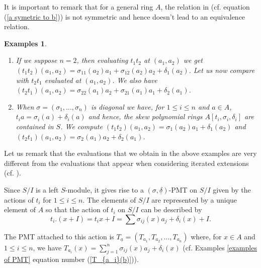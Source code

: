 \documentclass[12pt,a4paper]{article}
\newtheorem{examples}[theorem]{Examples}
\newtheorem{remark}[theorem]{Remark}
\newcommand{\de}{\delta}
\newcommand{\si}{\sigma}
\newcommand{\ua}{\underline{a}}
\begin{document}
{\rm 
	It is important to remark that for a general ring $A$, the relation in  (cf. equation (\ref{a symetric to b}))  is not symmetric and hence doesn't lead to an equivalence relation. 
}
	
	
	\begin{examples} \label{examples for evaluation}
		{\rm 
			\begin{enumerate}
				\item If we suppose $n=2$, then evaluating $t_1t_2$ at $(a_1, a_2)$ we get 
				$(t_1t_2)(a_1,a_2)=\si_{11}(a_2)a_1+\si_{12}(a_2)a_2+\de_1(a_
				2)$.  Let us now compare with $t_2t_1$ evaluated at $(a_1,a_2)$.  We also have $(t_2t_1)(a_1,a_2)=\sigma_{22}(a_1)a_2+\sigma_{21}(a_1)a_1+\delta_2(a_1)$.  
				
				\item When $\sigma=(\sigma_1,\dots,\sigma_n)$ is diagonal we have, for $1\le i \le n$ and $a\in A$, $t_ia=\sigma_i(a)+ \delta_i(a)$ and hence, the skew polynomial rings $A[t_i,\sigma_i,\delta_i]$ are contained in $S$.  We compute $(t_1t_2)(a_1,a_2)=\sigma_1(a_2)a_1+\delta_1(a_2)$ and $(t_2t_1)(a_1,a_2)=\sigma_2(a_1)a_2+\delta_2(a_1)$.
				
			\end{enumerate}
		}	
	\end{examples}
	 Let us remark that the evaluations that we obtain in the above examples are very different from the evaluations that appear when considering iterated extensions (cf. \cite{BL2023}). 
	\vspace{3mm}
	
	Since $S/I$ is a left $S$-module,  it gives rise to a  $(\si, \underline{\de})$-PMT on $S/I$ given by the actions of $t_i$ for $1\le i \le n$.  The elements of $S/I$ are represented by a unique element 
	of $A$ so  that the action of $t_i$ on $S/I$  can be described by
	$$t_i.(x+I)=t_ix+I=\sum     \si_{ij}(x)a_j+\de_i(x) +I.$$ 
	
	The PMT attached to this action is 
	$T_{\ua}=(T_{a_1},T_{a_2},\dots, T_{a_n})$ where, for $x\in A$ and $1\le i \le n$, we have $T_{a_i}(x)=\sum_{j=1}^n\si_{ij}(x)a_j + \de_i(x)$ (cf. Examples  \ref{examples of PMT} equation number (\ref{T_{a_i}(b)})).
	
\end{document}
